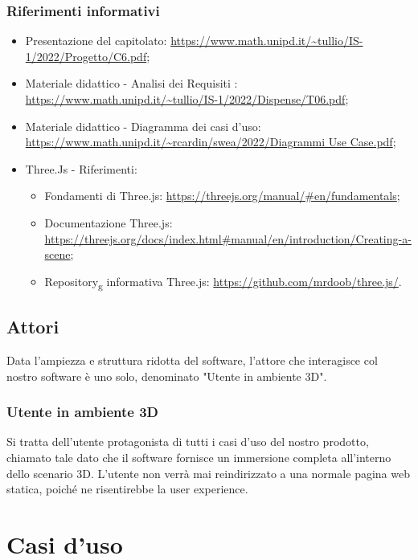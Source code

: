 \subsubsection{Riferimenti informativi}
\begin{itemize}
\item Presentazione del capitolato: \url{https://www.math.unipd.it/~tullio/IS-1/2022/Progetto/C6.pdf};
\item Materiale didattico - Analisi dei Requisiti : \url{https://www.math.unipd.it/~tullio/IS-1/2022/Dispense/T06.pdf};
\item Materiale didattico - Diagramma dei casi d’uso: \url{https://www.math.unipd.it/~rcardin/swea/2022/Diagrammi Use Case.pdf};
\item Three.Js - Riferimenti:
\begin{itemize}
\item Fondamenti di Three.js: \url{https://threejs.org/manual/#en/fundamentals};
\item Documentazione Three.js: \url{https://threejs.org/docs/index.html#manual/en/introduction/Creating-a-scene};
\item Repository\textsubscript{g} informativa Three.js: \url{https://github.com/mrdoob/three.js/}.
\end{itemize} 
\end{itemize}

\subsection{Attori}
Data l'ampiezza e struttura ridotta del software, l'attore che interagisce col nostro software è uno solo, denominato "Utente in ambiente 3D". 

\subsubsection{Utente in ambiente 3D}
Si tratta dell'utente protagonista di tutti i casi d'uso del nostro prodotto, chiamato tale dato che il software fornisce un immersione completa all'interno dello scenario 3D. \newline
L'utente non verrà mai reindirizzato a una normale pagina web statica, poiché ne risentirebbe la user experience. 

\pagebreak

\section{Casi d'uso}

